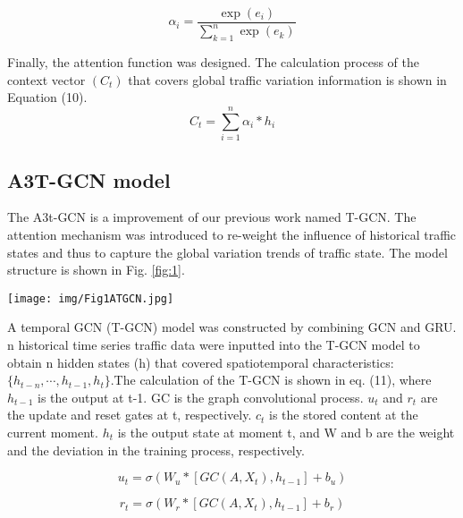 \documentclass[10pt,journal,compsoc]{IEEEtran}
\begin{document}
\begin{equation}
\alpha_{i} = \frac{\exp(e_{i})}{\sum_{k=1}^{n}\exp(e_{k})}
\end{equation}
\par Finally, the attention function was designed. The calculation process of the context vector $(C_t)$ that covers global traffic variation information is shown in Equation (10).
\begin{equation}
C_{t} =\sum_{i=1}^{n}\alpha_{i} \ast h_{i}
\end{equation}

\subsection{A3T-GCN model}
\par The A3t-GCN is a improvement of our previous work named T-GCN\cite{zhao2019t}. The attention mechanism was introduced to re-weight the influence of historical traffic states and thus to capture the global variation trends of traffic state. The model structure is shown in Fig. \ref{fig:1}.

\begin{figure*}[t]
	\centering
	\begin{center}
	   \texttt{[image: img/Fig1ATGCN.jpg]}
	   \caption{A3T-GCN framework.}
	   \end{center}
	   \label{fig:1}
	\end{figure*}

\par A temporal GCN (T-GCN) model was constructed by combining GCN and GRU. n historical time series traffic data were inputted into the T-GCN model to obtain n hidden states (h) that covered spatiotemporal characteristics:$\{h_{t-n},\cdots,h_{t-1},h_t\}$.The calculation of the T-GCN is shown in eq. (11), where $h_{t-1}$ is the output at t-1. GC is the graph convolutional process. $u_t$ and $r_t$ are the update and reset gates at t, respectively. $c_t$ is the stored content at the current moment. $h_t$ is the output state at moment t, and W and b are the weight and the deviation in the training process, respectively.

\begin{equation}
u_{t} = \sigma(W_{u} \ast [GC(A,X_{t}),h_{t-1}]+b_{u})
\end{equation}


\begin{equation}
r_{t} = \sigma (W_{r} \ast [GC(A,X_{t}),h_{t-1}]+b_{r})
\end{equation}
\end{document}
